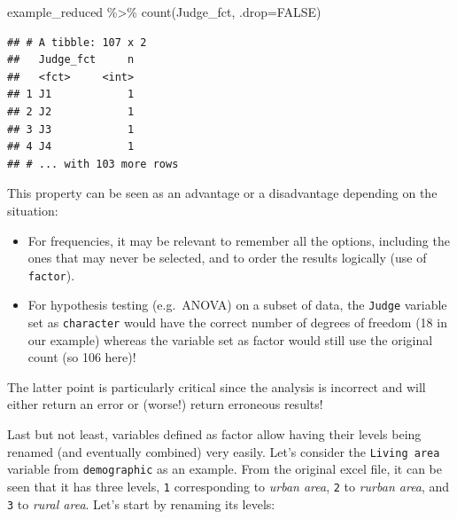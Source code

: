 \documentclass[
]{krantz}
\makeatletter
\newenvironment{Shaded}{\begin{snugshade}}{\end{snugshade}}
\newcommand{\AttributeTok}[1]{\textcolor[rgb]{0.61,0.61,0.61}{#1}}
\newcommand{\ConstantTok}[1]{\textcolor[rgb]{0,0,0}{#1}}
\newcommand{\DecValTok}[1]{\textcolor[rgb]{0.06,0.06,0.06}{#1}}
\newcommand{\FunctionTok}[1]{\textcolor[rgb]{0,0,0}{#1}}
\newcommand{\NormalTok}[1]{#1}
\newcommand{\OtherTok}[1]{\textcolor[rgb]{0.37,0.37,0.37}{#1}}
\newcommand{\SpecialCharTok}[1]{\textcolor[rgb]{0,0,0}{#1}}
\newcommand{\StringTok}[1]{\textcolor[rgb]{0.5,0.5,0.5}{#1}}
\providecommand{\tightlist}{%
  \setlength{\itemsep}{0pt}\setlength{\parskip}{0pt}}
\newenvironment{kframe}{%
\medskip{}
\setlength{\fboxsep}{.8em}
 \def\at@end@of@kframe{}%
 \ifinner\ifhmode%
  \def\at@end@of@kframe{\end{minipage}}%
  \begin{minipage}{\columnwidth}%
 \fi\fi%
 \def\FrameCommand##1{\hskip\@totalleftmargin \hskip-\fboxsep
 \colorbox{shadecolor}{##1}\hskip-\fboxsep
     \hskip-\linewidth \hskip-\@totalleftmargin \hskip\columnwidth}%
 \MakeFramed {\advance\hsize-\width
   \@totalleftmargin\z@ \linewidth\hsize
   \@setminipage}}%
 {\par\unskip\endMakeFramed%
 \at@end@of@kframe}
\renewenvironment{Shaded}{\begin{kframe}}{\end{kframe}}
\makeatother
\begin{document}
\begin{Shaded}
\begin{Highlighting}[]
\NormalTok{example\_reduced }\SpecialCharTok{\%\textgreater{}\%} 
  \FunctionTok{count}\NormalTok{(Judge\_fct, }\AttributeTok{.drop=}\ConstantTok{FALSE}\NormalTok{)}
\end{Highlighting}
\end{Shaded}

\begin{verbatim}
## # A tibble: 107 x 2
##   Judge_fct     n
##   <fct>     <int>
## 1 J1            1
## 2 J2            1
## 3 J3            1
## 4 J4            1
## # ... with 103 more rows
\end{verbatim}

This property can be seen as an advantage or a disadvantage depending on the situation:

\begin{itemize}
\tightlist
\item
  For frequencies, it may be relevant to remember all the options, including the ones that may never be selected, and to order the results logically (use of \texttt{factor}).
\item
  For hypothesis testing (e.g.~ANOVA) on a subset of data, the \texttt{Judge} variable set as \texttt{character} would have the correct number of degrees of freedom (18 in our example) whereas the variable set as factor would still use the original count (so 106 here)!
\end{itemize}

The latter point is particularly critical since the analysis is incorrect and will either return an error or (worse!) return erroneous results!

Last but not least, variables defined as factor allow having their levels being renamed (and eventually combined) very easily.
Let's consider the \texttt{Living\ area} variable from \texttt{demographic} as an example. From the original excel file, it can be seen that it has three levels, \texttt{1} corresponding to \emph{urban area}, \texttt{2} to \emph{rurban area}, and \texttt{3} to \emph{rural area}. Let's start by renaming its levels:

\begin{Shaded}
\end{Shaded}
\end{document}

